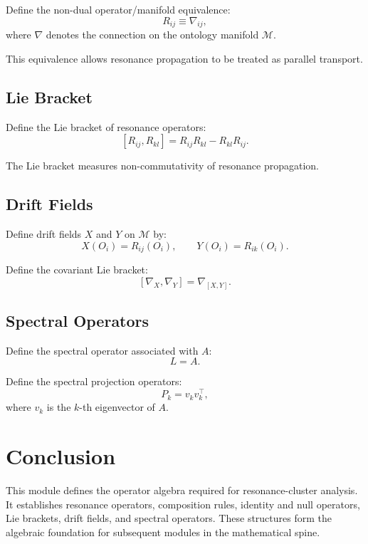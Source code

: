 Define the non-dual operator/manifold equivalence:
\[
R_{ij} \equiv \nabla_{ij},
\]
where $\nabla$ denotes the connection on the ontology manifold
$\mathcal{M}$.

This equivalence allows resonance propagation to be treated as parallel
transport.

\subsection{Lie Bracket}

Define the Lie bracket of resonance operators:
\[
[R_{ij}, R_{kl}] = R_{ij} R_{kl} - R_{kl} R_{ij}.
\]

The Lie bracket measures non-commutativity of resonance propagation.

\subsection{Drift Fields}

Define drift fields $X$ and $Y$ on $\mathcal{M}$ by:
\[
X(O_i) = R_{ij}(O_i), \qquad
Y(O_i) = R_{ik}(O_i).
\]

Define the covariant Lie bracket:
\[
[\nabla_X, \nabla_Y] = \nabla_{[X,Y]}.
\]

\subsection{Spectral Operators}

Define the spectral operator associated with $A$:
\[
L = A.
\]

Define the spectral projection operators:
\[
P_k = v_k v_k^\top,
\]
where $v_k$ is the $k$-th eigenvector of $A$.

\section{Conclusion}

This module defines the operator algebra required for resonance-cluster
analysis. It establishes resonance operators, composition rules,
identity and null operators, Lie brackets, drift fields, and spectral
operators. These structures form the algebraic foundation for subsequent
modules in the mathematical spine.
